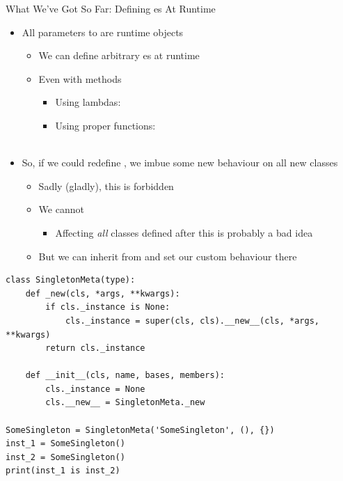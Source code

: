 
\begin{frame}[fragile]{What We've Got So Far: Defining es At Runtime}
%
\begin{itemize}
\item All parameters to  are runtime objects
	\begin{itemize}
	\item We can define arbitrary es at runtime
	\item Even with methods
		\begin{itemize}
		\item Using lambdas:\\
		\item Using proper functions: \\
			 \\
		\end{itemize}
	\end{itemize}
\item So, if we could redefine , we imbue some new behaviour on all new classes
	\begin{itemize}
	\item Sadly (gladly), this is forbidden
	\item We cannot 
		\begin{itemize}
		\item Affecting \emph{all} classes defined after this is probably a bad idea
		\end{itemize}
	\item But we can inherit from  and set our custom behaviour there
	\end{itemize}
\end{itemize}
%
\end{frame}


\begin{frame}[fragile]
%
\begin{codebox}
\begin{verbatim}
class SingletonMeta(type):
    def _new(cls, *args, **kwargs):
        if cls._instance is None:
            cls._instance = super(cls, cls).__new__(cls, *args, **kwargs)
        return cls._instance

    def __init__(cls, name, bases, members):
        cls._instance = None
        cls.__new__ = SingletonMeta._new

SomeSingleton = SingletonMeta('SomeSingleton', (), {})
inst_1 = SomeSingleton()
inst_2 = SomeSingleton()
print(inst_1 is inst_2)
\end{verbatim}
\end{codebox}
%
\end{frame}

